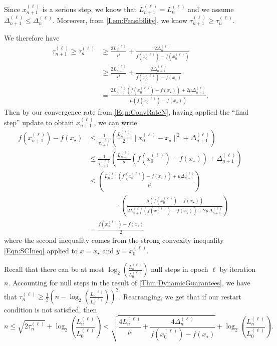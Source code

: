 \documentclass[11pt]{article}
\numberwithin{equation}{section}
\newcommand{\idxEpoch}{\ell}
\newcommand{\epoch}[1]{{#1}^{(\idxEpoch)}}
\theoremstyle{definition}
\theoremstyle{plain}
\theoremstyle{definition}
\begin{document}
Since $\epoch{x}_{n+1}$ is a serious step, we know that $\epoch{L}_{n+1} = \epoch{L}_n$ and we assume $\epoch{\Delta}_{n+1} \leq \epoch{\Delta}_n$. Moreover, from \cref{Lem:Feasibility}, we know $\epoch{\tau}_{n+1} \geq \epoch{\tau}_n$.

We therefore have
\begin{align*}
    \epoch{\tau}_{n+1} \geq \epoch{\tau}_n & \geq \frac{2 \epoch{L}_n}{\mu} + \frac{2 \epoch{\Delta}_n}{f(\epoch{x}_0) - f(\epoch{x}_n)} \\
    & \geq \frac{2 \epoch{L}_{n+1}}{\mu} + \frac{2 \epoch{\Delta}_{n+1}}{f(\epoch{x}_0) - f(x_\star)} \\
    & = \frac{2\epoch{L}_{n+1} (f(\epoch{x}_0) - f(x_\star)) + 2 \mu \epoch{\Delta}_{n+1}}{\mu(f(\epoch{x}_0) - f(x_\star))}.
\end{align*}
Then by our convergence rate from \eqref{Eqn:ConvRateN}, having applied the ``final step'' update to obtain $\epoch{x}_{n+1}$, we can write
\begin{align*}
    f(\epoch{x}_{n+1}) - f(x_\star) & \leq \frac{1}{\epoch{\tau}_{n+1}} \left(\frac{\epoch{L}_{n+1}}{2}\|\epoch{x}_0 - x_\star\|^2 + \epoch{\Delta}_{n+1} \right)\\
    &\leq \frac{1}{\epoch{\tau}_{n+1}} \left(\frac{\epoch{L}_{n+1}}{\mu}(f(\epoch{x}_0) - f(x_\star)) + \epoch{\Delta}_{n+1}\right) \\
    & \leq \left(\frac{\epoch{L}_{n+1}(f(\epoch{x}_0) - f(x_\star)) + \mu \epoch{\Delta}_{n+1}}{\mu}\right) \\
    & \qquad \qquad \cdot \left(\frac{\mu(f(\epoch{x}_0) - f(x_\star))}{2\epoch{L}_{n+1}(f(\epoch{x}_0) - f(x_\star)) + 2 \mu \epoch{\Delta}_{n+1}} \right) \\
    & = \frac{f(\epoch{x}_0) - f(x_\star)}{2}
\end{align*}
where the second inequality comes from the strong convexity inequality \eqref{Eqn:SCIneq} applied to $x = x_\star$ and $y = \epoch{x}_0$.

Recall that there can be at most $\log_2(\frac{\epoch{L}_{n}}{\epoch{L}_0})$ null steps in epoch $\idxEpoch$ by iteration $n$. Accounting for null steps in the result of \cref{Thm:DynamicGuarantees}, we have that $\epoch{\tau}_{n} \geq \frac{1}{2}(n - \log_2(\frac{\epoch{L}_{n}}{\epoch{L}_0}) )^2$. Rearranging, we get that if our restart condition is not satisfied, then
\begin{equation*}
    n \leq \sqrt{2\epoch{\tau}_{n}} + \log_2\left(\frac{\epoch{L}_{n}}{\epoch{L}_0}\right) < \sqrt{\frac{4 \epoch{L}_n}{\mu} + \frac{4 \epoch{\Delta}_n}{f(\epoch{x}_0) - f(x_\star)} } + \log_2\left(\frac{\epoch{L}_n}{\epoch{L}_0}\right).
\end{equation*}
\end{document}
